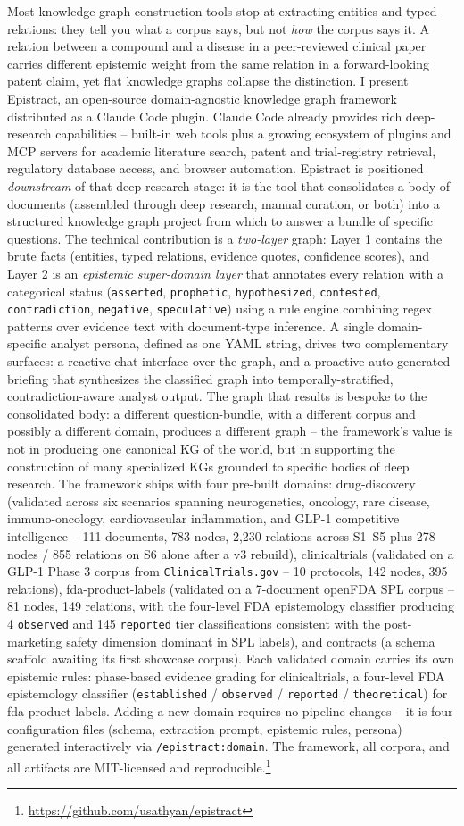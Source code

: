 Most knowledge graph construction tools stop at extracting entities and typed relations: they tell you what a corpus says, but not \emph{how} the corpus says it. A relation between a compound and a disease in a peer-reviewed clinical paper carries different epistemic weight from the same relation in a forward-looking patent claim, yet flat knowledge graphs collapse the distinction. I present Epistract, an open-source domain-agnostic knowledge graph framework distributed as a Claude Code plugin. Claude Code already provides rich deep-research capabilities -- built-in web tools plus a growing ecosystem of plugins and MCP servers for academic literature search, patent and trial-registry retrieval, regulatory database access, and browser automation. Epistract is positioned \emph{downstream} of that deep-research stage: it is the tool that consolidates a body of documents (assembled through deep research, manual curation, or both) into a structured knowledge graph project from which to answer a bundle of specific questions. The technical contribution is a \emph{two-layer} graph: Layer 1 contains the brute facts (entities, typed relations, evidence quotes, confidence scores), and Layer 2 is an \emph{epistemic super-domain layer} that annotates every relation with a categorical status (\texttt{asserted}, \texttt{prophetic}, \texttt{hypothesized}, \texttt{contested}, \texttt{contradiction}, \texttt{negative}, \texttt{speculative}) using a rule engine combining regex patterns over evidence text with document-type inference. A single domain-specific analyst persona, defined as one YAML string, drives two complementary surfaces: a reactive chat interface over the graph, and a proactive auto-generated briefing that synthesizes the classified graph into temporally-stratified, contradiction-aware analyst output. The graph that results is bespoke to the consolidated body: a different question-bundle, with a different corpus and possibly a different domain, produces a different graph -- the framework's value is not in producing one canonical KG of the world, but in supporting the construction of many specialized KGs grounded to specific bodies of deep research. The framework ships with four pre-built domains: drug-discovery (validated across six scenarios spanning neurogenetics, oncology, rare disease, immuno-oncology, cardiovascular inflammation, and GLP-1 competitive intelligence -- 111 documents, 783 nodes, 2{,}230 relations across S1--S5 plus 278 nodes / 855 relations on S6 alone after a v3 rebuild), clinicaltrials (validated on a GLP-1 Phase 3 corpus from \texttt{ClinicalTrials.gov} -- 10 protocols, 142 nodes, 395 relations), fda-product-labels (validated on a 7-document openFDA SPL corpus -- 81 nodes, 149 relations, with the four-level FDA epistemology classifier producing 4 \texttt{observed} and 145 \texttt{reported} tier classifications consistent with the post-marketing safety dimension dominant in SPL labels), and contracts (a schema scaffold awaiting its first showcase corpus). Each validated domain carries its own epistemic rules: phase-based evidence grading for clinicaltrials, a four-level FDA epistemology classifier (\texttt{established} / \texttt{observed} / \texttt{reported} / \texttt{theoretical}) for fda-product-labels. Adding a new domain requires no pipeline changes -- it is four configuration files (schema, extraction prompt, epistemic rules, persona) generated interactively via \texttt{/epistract:domain}. The framework, all corpora, and all artifacts are MIT-licensed and reproducible.\footnote{\url{https://github.com/usathyan/epistract}}
